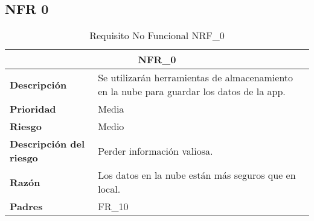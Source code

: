 \documentclass{scrreprt}
\begin{document}
\subsection{NFR 0}
\begin{table}[H]
    \label{tab:my-table}
    \begin{tabular}{|p{5cm}|p{11cm}|}
    \hline
    \multicolumn{2}{|c|}{\textbf{NFR_0}} \\
    \hline
    \textbf{Descripción  }                      &  Se utilizarán herramientas de almacenamiento en la nube para guardar los datos de la app.                                                                            \\ \hline
    \textbf{Prioridad}                          & Media                                                                                              \\ \hline
    \textbf{Riesgo}                          & Medio                                                                                                \\ \hline
    \textbf{Descripción del riesgo}                    & Perder información valiosa.                                                                               \\ \hline
    \textbf{Razón}                   & Los datos en la nube están más seguros que en local.                                                                                               \\ \hline
    \textbf{Padres}                               &  FR_10\\  \hline
    \end{tabular}%
    
    \caption{Requisito No Funcional NRF_0}
\end{table}
\end{document}
